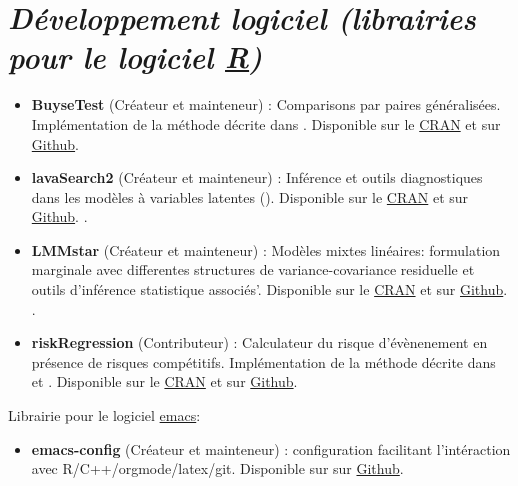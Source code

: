 \documentclass[12pt]{article}
\begin{document}
\section*{\emph{Développement logiciel (librairies pour le logiciel \href{https://www.r-project.org/}{R})}}
\label{sec:org7f4179e}
\begin{minipage}{0.01\textwidth}
\hspace{\fill}
\end{minipage}
\begin{minipage}{0.92\textwidth}
\begin{itemize}
\item \textbf{BuyseTest} (Créateur et mainteneur) : Comparisons par paires
généralisées. Implémentation de la méthode décrite dans
\citep{peron2016extension,peron2021correcting}. Disponible sur le \href{https://cran.r-project.org/web/packages/BuyseTest/index.html}{CRAN}
et sur \href{https://github.com/bozenne/BuyseTest}{Github}.

\item \textbf{lavaSearch2} (Créateur et mainteneur) : Inférence et outils
diagnostiques dans les modèles à variables latentes
(\cite{ozenne2020small,ozenne2022controling}). Disponible sur
le \href{https://cran.r-project.org/web/packages/lavaSearch2/index.html}{CRAN} et sur \href{https://github.com/bozenne/lavaSearch2}{Github}. .

\item \textbf{LMMstar} (Créateur et mainteneur) : Modèles mixtes linéaires:
formulation marginale avec differentes structures de
variance-covariance residuelle et outils d'inférence statistique
associés'. Disponible sur le \href{https://cran.r-project.org/web/packages/LMMstar/index.html}{CRAN} et sur \href{https://github.com/bozenne/LMMstar}{Github}. .

\item \textbf{riskRegression} (Contributeur) : Calculateur du risque
d'évènenement en présence de risques compétitifs. Implémentation de
la méthode décrite dans \cite{ozenne2017riskregression} et
\cite{ozenne2020estimation}. Disponible sur le \href{https://cran.r-project.org/web/packages/riskRegression/index.html}{CRAN} et sur \href{https://github.com/tagteam/riskRegression}{Github}.
\end{itemize}
\end{minipage}

\bigskip

Librairie pour le logiciel \href{https://www.gnu.org/software/emacs/}{emacs}:
\begin{itemize}
\item \textbf{emacs-config} (Créateur et mainteneur) : configuration facilitant
l'intéraction avec R/C++/orgmode/latex/git. Disponible sur sur
\href{https://github.com/bozenne/emacs-config}{Github}.
\end{itemize}
\end{document}
